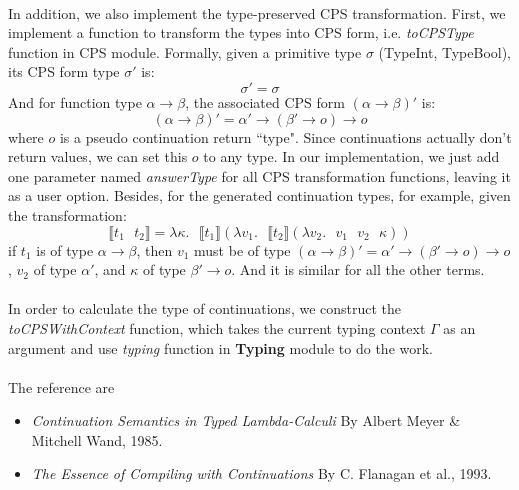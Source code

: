 \documentclass[10pt]{article}
\begin{document}
\paragraph{}
In addition, we also implement the type-preserved CPS transformation. First, we implement a function to transform the types into CPS form, i.e. \textit{toCPSType} function in CPS module. Formally, given a primitive type $\sigma$ (TypeInt, TypeBool), its CPS form type $\sigma'$ is:
\[
        \sigma' = \sigma
\]
And for function type $\alpha \rightarrow \beta$, the associated CPS form $(\alpha \rightarrow \beta)'$ is:
\[
        (\alpha \rightarrow \beta)' = \alpha' \rightarrow (\beta' \rightarrow o) \rightarrow o 
\]
where $o$ is a pseudo continuation return ``type". Since continuations actually don't return values, we can set this $o$ to any type. In our implementation, we just add one parameter named \textit{answerType} for all CPS transformation functions, leaving it as a user option. Besides, for the generated continuation types, for example, given the transformation:
\[
        \llbracket t_1\text{ }t_2 \rrbracket = \lambda \kappa.\text{ }\llbracket t_1 \rrbracket (\lambda v_1.\text{ }\llbracket t_2 \rrbracket (\lambda v_2.\text{ }v_1\text{ }v_2\text{ }\kappa))
\]
if $t_1$ is of type $\alpha \rightarrow \beta$, then $v_1$ must be of type $(\alpha \rightarrow \beta)' = \alpha' \rightarrow (\beta' \rightarrow o) \rightarrow o$, $v_2$ of type $\alpha'$, and $\kappa$ of type $\beta' \rightarrow o$. And it is similar for all the other terms.

\paragraph{}
In order to calculate the type of continuations, we construct the \textit{toCPSWithContext} function, which takes the current typing context $\Gamma$ as an argument and use \textit{typing} function in \textbf{Typing} module to do the work.

\paragraph{}
The reference are
\begin{itemize}
        \item
        \emph{Continuation Semantics in Typed Lambda-Calculi}  By Albert Meyer \& Mitchell Wand, 1985.
        \item
        \emph{The Essence of Compiling with Continuations} By C. Flanagan et al., 1993.
\end{itemize}
\end{document}
